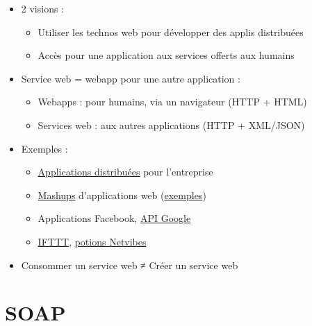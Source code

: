 \begin{itemize}
\tightlist
\item
  2 visions :

  \begin{itemize}
  \tightlist
  \item
    Utiliser les technos web pour développer des applis distribuées
  \item
    Accès pour une application aux services offerts aux humains
  \end{itemize}
\item
  Service web = webapp pour une autre application :

  \begin{itemize}
  \tightlist
  \item
    Webapps : pour humains, via un navigateur (HTTP + HTML)
  \item
    Services web : aux autres applications (HTTP + XML/JSON)
  \end{itemize}
\item
  Exemples :

  \begin{itemize}
  \tightlist
  \item
    \href{https://upload.wikimedia.org/wikipedia/commons/3/3f/Concept_WS.jpg}{Applications
    distribuées} pour l'entreprise
  \item
    \href{https://fr.wikipedia.org/wiki/Application_composite}{Mashups}
    d'applications web
    (\href{http://www.programmableweb.com/category/all/mashups}{exemples})
  \item
    Applications Facebook,
    \href{https://developers.google.com/apis-explorer/}{API Google}
  \item
    \href{https://ifttt.com/}{IFTTT},
    \href{http://www.netvibes.com/fr/dashboardofthings}{potions
    Netvibes}
  \end{itemize}
\item
  Consommer un service web ≠ Créer un service web
\end{itemize}

\hypertarget{soap}{%
\section{SOAP}\label{soap}}

